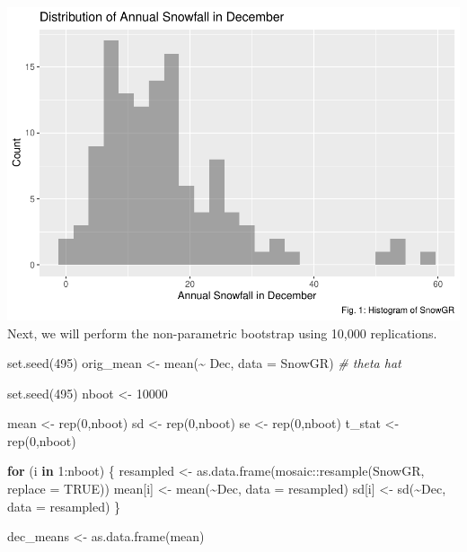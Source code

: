 \documentclass[12pt]{article}
\newenvironment{Shaded}{\begin{snugshade}}{\end{snugshade}}
\newcommand{\AttributeTok}[1]{\textcolor[rgb]{0.77,0.63,0.00}{#1}}
\newcommand{\CommentTok}[1]{\textcolor[rgb]{0.56,0.35,0.01}{\textit{#1}}}
\newcommand{\ConstantTok}[1]{\textcolor[rgb]{0.00,0.00,0.00}{#1}}
\newcommand{\ControlFlowTok}[1]{\textcolor[rgb]{0.13,0.29,0.53}{\textbf{#1}}}
\newcommand{\DecValTok}[1]{\textcolor[rgb]{0.00,0.00,0.81}{#1}}
\newcommand{\FunctionTok}[1]{\textcolor[rgb]{0.00,0.00,0.00}{#1}}
\newcommand{\NormalTok}[1]{#1}
\newcommand{\OtherTok}[1]{\textcolor[rgb]{0.56,0.35,0.01}{#1}}
\newcommand{\SpecialCharTok}[1]{\textcolor[rgb]{0.00,0.00,0.00}{#1}}
\begin{document}
\includegraphics{paper_files/figure-latex/SnowGR histogram-1.pdf} Next,
we will perform the non-parametric bootstrap using 10,000 replications.

\begin{Shaded}
\begin{Highlighting}[]
\FunctionTok{set.seed}\NormalTok{(}\DecValTok{495}\NormalTok{)}
\NormalTok{orig\_mean }\OtherTok{\textless{}{-}} \FunctionTok{mean}\NormalTok{(}\SpecialCharTok{\textasciitilde{}}\NormalTok{ Dec, }\AttributeTok{data =}\NormalTok{ SnowGR) }\CommentTok{\# theta hat}

\FunctionTok{set.seed}\NormalTok{(}\DecValTok{495}\NormalTok{)}
\NormalTok{nboot }\OtherTok{\textless{}{-}} \DecValTok{10000}

\NormalTok{mean }\OtherTok{\textless{}{-}} \FunctionTok{rep}\NormalTok{(}\DecValTok{0}\NormalTok{,nboot)}
\NormalTok{sd }\OtherTok{\textless{}{-}} \FunctionTok{rep}\NormalTok{(}\DecValTok{0}\NormalTok{,nboot)}
\NormalTok{se }\OtherTok{\textless{}{-}} \FunctionTok{rep}\NormalTok{(}\DecValTok{0}\NormalTok{,nboot)}
\NormalTok{t\_stat }\OtherTok{\textless{}{-}} \FunctionTok{rep}\NormalTok{(}\DecValTok{0}\NormalTok{,nboot)}

\ControlFlowTok{for}\NormalTok{ (i }\ControlFlowTok{in} \DecValTok{1}\SpecialCharTok{:}\NormalTok{nboot) \{}
\NormalTok{  resampled }\OtherTok{\textless{}{-}} \FunctionTok{as.data.frame}\NormalTok{(mosaic}\SpecialCharTok{::}\FunctionTok{resample}\NormalTok{(SnowGR, }\AttributeTok{replace =} \ConstantTok{TRUE}\NormalTok{))}
\NormalTok{  mean[i] }\OtherTok{\textless{}{-}} \FunctionTok{mean}\NormalTok{(}\SpecialCharTok{\textasciitilde{}}\NormalTok{Dec, }\AttributeTok{data =}\NormalTok{ resampled)}
\NormalTok{  sd[i] }\OtherTok{\textless{}{-}} \FunctionTok{sd}\NormalTok{(}\SpecialCharTok{\textasciitilde{}}\NormalTok{Dec, }\AttributeTok{data =}\NormalTok{ resampled)}
\NormalTok{\}}

\NormalTok{dec\_means }\OtherTok{\textless{}{-}} \FunctionTok{as.data.frame}\NormalTok{(mean)}
\end{Highlighting}
\end{Shaded}
\end{document}
